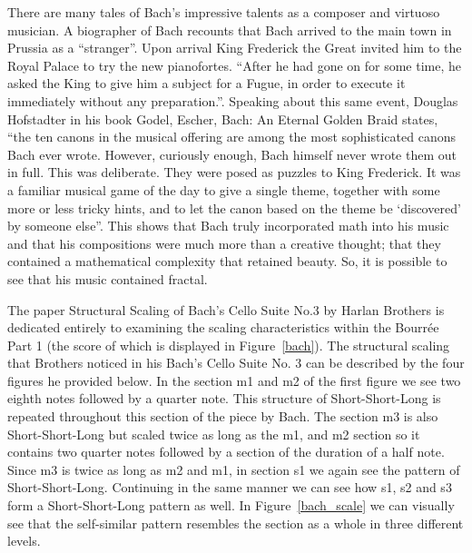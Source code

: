 \documentclass{article}
\begin{document}
There are many tales of Bach's impressive talents as a composer and virtuoso
musician. A biographer of Bach recounts that Bach arrived to the main  town in
Prussia as a “stranger”. Upon arrival King Frederick the Great invited him to
the Royal Palace to try the new pianofortes. ``After he had gone on for some
time, he asked the King to give him a subject for a Fugue, in order to execute
it immediately without any preparation.''\cite{6}. Speaking about this same event,
Douglas Hofstadter in his book Godel, Escher, Bach: An Eternal Golden Braid
states, ``the ten canons in the musical offering are among the most sophisticated
canons Bach ever wrote. However, curiously enough, Bach himself never wrote them
out in full. This was deliberate. They were posed as puzzles to King Frederick.
It was a familiar musical game of the day to give a single theme, together with
some more or less tricky hints, and to let the canon based on the theme be
`discovered' by someone else''\cite{7}. This shows that Bach truly incorporated math
into his music and that his compositions were much more than a creative thought;
that they contained a mathematical complexity that retained beauty. So, it is
possible to see that his music contained fractal.

The paper Structural Scaling of Bach’s Cello Suite No.3 by Harlan Brothers is
dedicated entirely to examining the scaling characteristics within the Bourrée
Part 1 (the score of which is displayed in Figure~\ref{bach}). The structural
scaling that Brothers noticed in his Bach’s Cello Suite No. 3 can be described
by the four figures he provided below. In the section m1 and m2 of the first
figure we see two eighth notes followed by a
quarter note. This structure of Short-Short-Long is repeated throughout this
section of the piece by Bach. The section m3 is also Short-Short-Long but scaled
twice as long as the m1, and m2 section so it contains two quarter notes
followed by a section of the duration of a half note. Since m3 is twice as long
as m2 and m1, in section s1 we again see the pattern of Short-Short-Long.
Continuing in the same manner we can see how s1, s2 and s3 form a
Short-Short-Long pattern as well. In Figure~\ref{bach_scale} we can visually see
that the self-similar pattern resembles the section as a whole in three
different levels.
\end{document}
